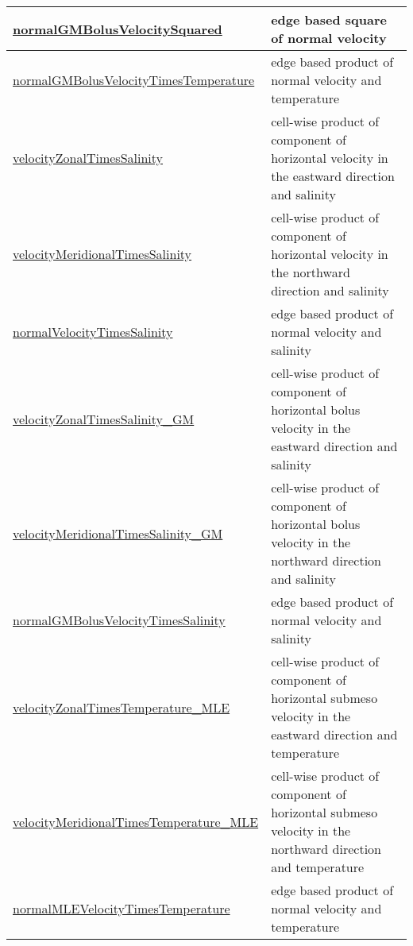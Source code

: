{\begin{center}
\begin{longtable}{| p{2.0in} | p{4.0in} |}
    \hline
    \hyperref[subsec:var_sec_eddyProductVariablesAM_normalGMBolusVelocitySquared]{normalGMBolusVelocitySquared} & edge based square of normal velocity \\
    \hline
    \hyperref[subsec:var_sec_eddyProductVariablesAM_normalGMBolusVelocityTimesTemperature]{normalGMBolusVelocityTimes\-Temperature} & edge based product of normal velocity and temperature \\
    \hline
    \hyperref[subsec:var_sec_eddyProductVariablesAM_velocityZonalTimesSalinity]{velocityZonalTimesSalinity} & cell-wise product of component of horizontal velocity in the eastward direction and salinity \\
    \hline
    \hyperref[subsec:var_sec_eddyProductVariablesAM_velocityMeridionalTimesSalinity]{velocityMeridionalTimesSalinity} & cell-wise product of component of horizontal velocity in the northward direction and salinity \\
    \hline
    \hyperref[subsec:var_sec_eddyProductVariablesAM_normalVelocityTimesSalinity]{normalVelocityTimesSalinity} & edge based product of normal velocity and salinity \\
    \hline
    \hyperref[subsec:var_sec_eddyProductVariablesAM_velocityZonalTimesSalinity_GM]{velocityZonalTimesSalinity\_GM} & cell-wise product of component of horizontal bolus velocity in the eastward direction and salinity \\
    \hline
    \hyperref[subsec:var_sec_eddyProductVariablesAM_velocityMeridionalTimesSalinity_GM]{velocityMeridionalTimesSalinity\_\-GM} & cell-wise product of component of horizontal bolus velocity in the northward direction and salinity \\
    \hline
    \hyperref[subsec:var_sec_eddyProductVariablesAM_normalGMBolusVelocityTimesSalinity]{normalGMBolusVelocityTimes\-Salinity} & edge based product of normal velocity and salinity \\
    \hline
    \hyperref[subsec:var_sec_eddyProductVariablesAM_velocityZonalTimesTemperature_MLE]{velocityZonalTimesTemperature\_\-MLE} & cell-wise product of component of horizontal submeso velocity in the eastward direction and temperature \\
    \hline
    \hyperref[subsec:var_sec_eddyProductVariablesAM_velocityMeridionalTimesTemperature_MLE]{velocityMeridionalTimes\-Temperature\_MLE} & cell-wise product of component of horizontal submeso velocity in the northward direction and temperature \\
    \hline
    \hyperref[subsec:var_sec_eddyProductVariablesAM_normalMLEVelocityTimesTemperature]{normalMLEVelocityTimes\-Temperature} & edge based product of normal velocity and temperature \\

\end{longtable}
\end{center}}
